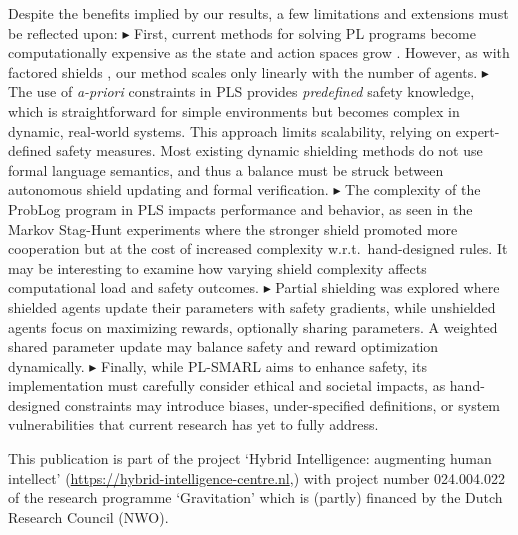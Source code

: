 \documentclass{ecai}
\theoremstyle{plain}
\theoremstyle{definition}
\theoremstyle{remark}
\begin{document}
Despite the benefits implied by our results, a few limitations and extensions must be reflected upon:
    $\blacktriangleright$ First, current methods for solving PL programs become computationally expensive as the state and action spaces grow \citep{fierens2015inference}. However, as with factored shields \citep{elsayed2021safe}, our method scales only linearly with the number of agents. %
    $\blacktriangleright$  The use of \textit{a-priori} constraints in PLS provides \textit{predefined} safety knowledge, which is straightforward for simple environments but becomes complex in dynamic, real-world systems. This approach limits scalability, relying on expert-defined safety measures. Most existing dynamic shielding methods do not use formal language semantics, and thus a balance must be struck between autonomous shield updating and formal verification.
    $\blacktriangleright$  The complexity of the ProbLog program in PLS impacts performance and behavior, as seen in the Markov Stag-Hunt experiments where the stronger shield promoted more cooperation but at the cost of increased complexity w.r.t.\ hand-designed rules. It may be interesting to examine how varying shield complexity affects computational load and safety outcomes. 
    $\blacktriangleright$  Partial shielding was explored where shielded agents update their parameters with safety gradients, while unshielded agents focus on maximizing rewards, optionally sharing parameters. A weighted shared parameter update may balance safety and reward optimization dynamically. 
    $\blacktriangleright$  Finally, while PL-SMARL aims to enhance safety, its implementation must carefully consider ethical and societal impacts, as hand-designed constraints may introduce biases, under-specified definitions, or system vulnerabilities that current research has yet to fully address.



\begin{ack}
This publication is part of the project `Hybrid Intelligence: augmenting human intellect' (\url{https://hybrid-intelligence-centre.nl},) with project number 024.004.022 of the research programme ‘Gravitation’ which is (partly) financed by the Dutch Research Council (NWO).
\end{ack}
\end{document}
